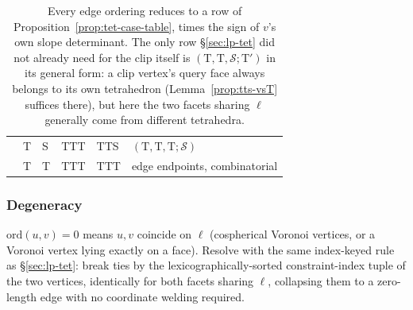 \documentclass[12pt]{article}
\theoremstyle{definition}
\theoremstyle{remark}
\begin{document}
\begin{table}[h!]
\begin{tabular}{@{}llllll@{}}
                             & T & S & TTT & TTS & $(\mathrm T,\mathrm T,\mathrm T;\mathcal S)$ \\
                             & T & T & TTT & TTT & edge endpoints, combinatorial \\
\hline
\end{tabular}
\caption{Every edge ordering reduces to a row of
Proposition~\ref{prop:tet-case-table}, times the sign of $v$'s own slope
determinant. The only row \S\ref{sec:lp-tet} did not already need for the
clip itself is $(\mathrm T,\mathrm T,\mathcal S;\mathrm T')$ in its general
form: a clip vertex's query face always belongs to its own tetrahedron
(Lemma~\ref{prop:tts-vsT} suffices there), but here the two facets sharing
$\ell$ generally come from different tetrahedra.}
\end{table}

\FloatBarrier

\subsubsection*{Degeneracy}

$\mathrm{ord}(u,v)=0$ means $u,v$ coincide on $\ell$ (cospherical Voronoi
vertices, or a Voronoi vertex lying exactly on a face). Resolve with the
same index-keyed rule as \S\ref{sec:lp-tet}: break ties by the
lexicographically-sorted constraint-index tuple of the two vertices,
identically for both facets sharing $\ell$, collapsing them to a
zero-length edge with no coordinate welding required.

\printbibliography
\end{document}
